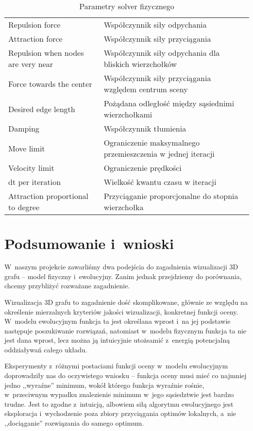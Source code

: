 \documentclass[a4paper,onecolumn,oneside,12pt]{mwart}
\begin{document}
\begin{table}[h!]
	\centering
	\begin{tabular}{p{}p{}}
		\hline
Repulsion force & Współczynnik siły odpychania \\
Attraction force & Współczynnik siły przyciągania \\
Repulsion when nodes are very near & Współczynnik siły odpychania dla bliskich wierzchołków \\
Force towards the center & Współczynnik siły przyciągania względem centrum sceny \\
Desired edge length & Pożądana odległość między sąsiednimi wierzchołkami \\
Damping & Współczynnik tłumienia \\
Move limit & Ograniczenie maksymalnego przemieszczenia w jednej iteracji \\
Velocity limit & Ograniczenie prędkości \\
dt per iteration & Wielkość kwantu czasu w iteracji \\
Attraction proportional to degree & Przyciąganie proporcjonalne do stopnia wierzchołka \\
		\hline
	\end{tabular}
	\caption{Parametry solver fizycznego}
	\label{tab:params-solver-force}
\end{table}

\clearpage


\section{Podsumowanie i~wnioski}

W~naszym projekcie zawarliśmy dwa podejścia do zagadnienia wizualizacji 3D
grafu -- model fizyczny i~ewolucyjny. Zanim jednak przejdziemy do
porównania, chcemy przybliżyć rozważane zagadnienie.

Wizualizacja 3D grafu to zagadnienie dość skomplikowane, głównie ze względu
na określenie mierzalnych kryteriów jakości wizualizacji, konkretnej
funkcji oceny. W~modelu ewolucyjnym funkcja ta jest określana wprost i~na
jej podstawie następuje poszukiwanie rozwiązań, natomiast w~modelu
fizycznym funkcja ta nie jest dana wprost, lecz można ją intuicyjnie
utożsamić z~energią potencjalną oddziaływań całego układu.

Eksperymenty z~różnymi postaciami funkcji oceny w~modelu ewolucyjnym
doprowadziły nas do oczywistego wniosku -- funkcja oceny musi mieć co
najmniej jedno ,,wyraźne'' minimum, wokół którego funkcja wyraźnie rośnie,
w~przeciwnym wypadku znalezienie minimum w~jego sąsiedztwie jest bardzo
trudne. Jest to zgodne z~intuicją, albowiem siłą algorytmu ewolucyjnego
jest eksploracja i~wychodzenie poza zbiory przyciągania optimów lokalnych,
a~nie ,,dociąganie'' rozwiązania do samego optimum.
\end{document}
